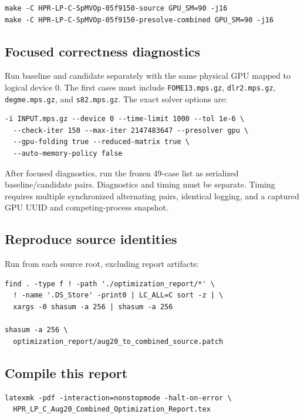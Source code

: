 \documentclass[10pt,a4paper]{article}
\begin{document}
\begin{lstlisting}[style=reportcode]
make -C HPR-LP-C-SpMVOp-05f9150-source GPU_SM=90 -j16
make -C HPR-LP-C-SpMVOp-05f9150-presolve-combined GPU_SM=90 -j16
\end{lstlisting}

\subsection{Focused correctness diagnostics}

Run baseline and candidate separately with the same physical GPU mapped to
logical device 0.  The first cases must include \texttt{FOME13.mps.gz},
\texttt{dlr2.mps.gz}, \texttt{degme.mps.gz}, and \texttt{s82.mps.gz}.
The exact solver options are:

\begin{lstlisting}[style=reportcode]
-i INPUT.mps.gz --device 0 --time-limit 1000 --tol 1e-6 \
  --check-iter 150 --max-iter 2147483647 --presolver gpu \
  --gpu-folding true --reduced-matrix true \
  --auto-memory-policy false
\end{lstlisting}

After focused diagnostics, run the frozen 49-case list as serialized
baseline/candidate pairs.  Diagnostics and timing must be separate.  Timing
requires multiple synchronized alternating pairs, identical logging, and a
captured GPU UUID and competing-process snapshot.

\subsection{Reproduce source identities}

Run from each source root, excluding report artifacts:

\begin{lstlisting}[style=reportcode]
find . -type f ! -path './optimization_report/*' \
  ! -name '.DS_Store' -print0 | LC_ALL=C sort -z | \
  xargs -0 shasum -a 256 | shasum -a 256

shasum -a 256 \
  optimization_report/aug20_to_combined_source.patch
\end{lstlisting}

\subsection{Compile this report}

\begin{lstlisting}[style=reportcode]
latexmk -pdf -interaction=nonstopmode -halt-on-error \
  HPR_LP_C_Aug20_Combined_Optimization_Report.tex
\end{lstlisting}
\end{document}
